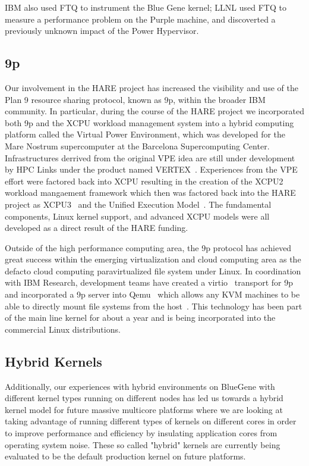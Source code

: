IBM also used FTQ to instrument the Blue Gene kernel\cite{bgpftq}\cite{morari2011quantitative}; 
LLNL used FTQ to measure a performance problem on the 
Purple machine, and discoverted a previously unknown impact of the
Power Hypervisor.

\subsection{9p}

Our involvement in the HARE project has increased the visibility and use
of the Plan 9 resource sharing protocol, known as 9p, within the broader IBM community.
In particular, during the course of the HARE project we incorporated both 9p and the XCPU
workload management system into a hybrid computing platform called the Virtual Power
Environment, which was developed for the Mare Nostrum supercomputer at the Barcelona 
Supercomputing Center.  Infrastructures derrived from the original VPE idea are still
under development by HPC Links under the product named VERTEX~\cite{vertex}.
Experiences from the VPE effort were factored back into XCPU
resulting in the creation of the XCPU2~\cite{xcpu2} workload mangaement framework which then was
factored back into the HARE project as XCPU3~\cite{xcpu3} and the 
Unified Execution Model~\cite{uem}.  The fundamental components, Linux kernel support, and
advanced XCPU models were all developed as a direct result of the HARE funding.

Outside of the high performance computing area, the 9p protocol has achieved great success
within the emerging virtualization and cloud computing area as the defacto cloud computing
paravirtualized file system under Linux.  In coordination with IBM Research, development
teams have created a virtio~\cite{virtio} transport for 9p and incorporated a 9p server into
Qemu~\cite{qemu} which allows any KVM machines to be able to directly mount file systems
from the host~\cite{virtfs}.  This technology has been part of the main line kernel for about
a year and is being incorporated into the commercial Linux distributions.

\subsection{Hybrid Kernels}

Additionally, our experiences with hybrid environments on BlueGene with different kernel
types running on different nodes has led us towards a hybrid kernel model for future
massive multicore platforms where we are looking at taking advantage of running different
types of kernels on different cores in order to improve performance and efficiency by
insulating application cores from operating system noise.  These so called "hybrid" kernels
are currently being evaluated to be the default production kernel on future platforms.

